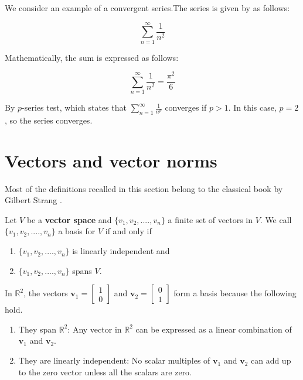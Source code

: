 \begin{example}
    We consider an example of a convergent series.The series is given by as follows:

\[ \sum_{n=1}^{\infty} \frac{1}{n^2} \]

Mathematically, the sum is expressed as follows:

\[ \sum_{n=1}^{\infty} \frac{1}{n^2} = \frac{\pi^2}{6} \]

By $p$-series test, which states that \( \sum_{n=1}^{\infty} \frac{1}{n^p} \) converges if \( p > 1 \). In this case, \( p = 2 \), so the series converges.
\end{example}




\bigskip\bigskip

\section{Vectors and vector norms}
Most of the definitions recalled in this section belong to the classical book by Gilbert Strang \cite{gilbertstrang}.
\begin{definition}
Let $V$ be a \textbf{vector space} and $\{v_1,v_2,....,v_n\}$ a finite set of vectors in $V$. We call $\{v_1,v_2,....,v_n\}$ a basis for $V$ if and only if
\begin{enumerate}
 \item $\{v_1,v_2,....,v_n\}$ is linearly independent and
 \item $\{v_1,v_2,....,v_n\}$ spans $V$.
\end{enumerate}
In \(\mathbb{R}^2\), the vectors \(\mathbf{v}_1 = \begin{bmatrix} 1 \\ 0 \end{bmatrix}\) and \(\mathbf{v}_2 = \begin{bmatrix} 0 \\ 1 \end{bmatrix}\) form a basis because the following hold.
\begin{enumerate}
    \item They span \(\mathbb{R}^2\): Any vector in \(\mathbb{R}^2\) can be expressed as a linear combination of \(\mathbf{v}_1\) and \(\mathbf{v}_2\).
    \item They are linearly independent: No scalar multiples of \(\mathbf{v}_1\) and \(\mathbf{v}_2\) can add up to the zero vector unless all the scalars are zero.
\end{enumerate}
\end{definition}
